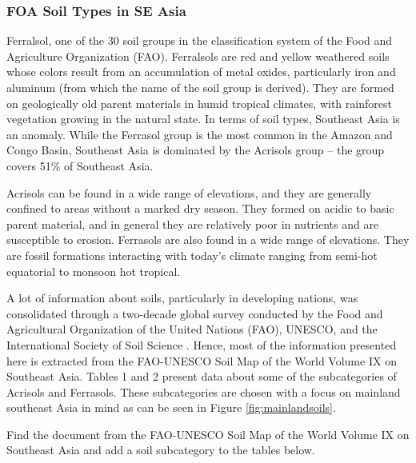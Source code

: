 \subsubsection{FOA Soil Types in SE Asia}

Ferralsol, one of the 30 soil groups in the classification system of the Food and Agriculture Organization (FAO). Ferralsols are red and yellow weathered soils whose colors result from an accumulation of metal oxides, particularly iron and aluminum (from which the name of the soil group is derived). They are formed on geologically old parent materials in humid tropical climates, with rainforest vegetation growing in the natural state. In terms of soil types, Southeast Asia is an anomaly. While the Ferrasol group is the most common in the Amazon and Congo Basin, Southeast Asia is dominated by the Acrisols group \citep{kyuma1966major} -- the group covers 51\% of Southeast Asia. 

Acrisols can be found in a wide range of elevations, and they are generally confined to areas without a marked dry season. They formed on acidic to basic parent material, and in general they are relatively poor in nutrients and are susceptible to erosion. Ferrasols are also found in a wide range of elevations. They are fossil formations interacting with today's climate ranging from semi-hot equatorial to monsoon hot tropical. 

A lot of information about soils, particularly in developing nations, was consolidated through a two-decade global survey conducted by the Food and Agricultural Organization of the United Nations (FAO), UNESCO, and the International Society of Soil Science \citep{dudal2005soils}. Hence, most of the information presented here is extracted from the FAO-UNESCO Soil Map of the World Volume IX on Southeast Asia. Tables 1 and 2 present data about some of the subcategories of Acrisols and Ferrasols. These subcategories are chosen with a focus on mainland southeast Asia in mind as can be seen in Figure \ref{fig:mainlandsoils}.

\begin{exercise}
Find the document from the FAO-UNESCO Soil Map of the World Volume IX on Southeast Asia and add a soil subcategory to the tables below.
\end{exercise}

